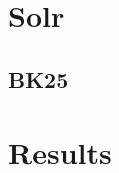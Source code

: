 \documentclass[11pt]{article}
\begin{document}
    \section{Solr}

    \subsection{BK25}

    \section{Results}



    
\end{document}
